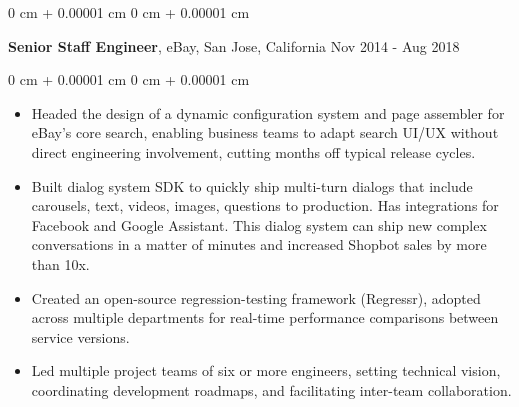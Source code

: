\documentclass[10pt, letterpaper]{article}
\newenvironment{highlights}{
    \begin{itemize}[
        topsep=0.10 cm,
        parsep=0.10 cm,
        partopsep=0pt,
        itemsep=0pt,
        leftmargin=0 cm + 10pt
    ]
}{
    \end{itemize}
} %
\newenvironment{onecolentry}{
    \begin{adjustwidth}{
        0 cm + 0.00001 cm
    }{
        0 cm + 0.00001 cm
    }
}{
    \end{adjustwidth}
} %
\newenvironment{twocolentry}[2][]{
    \onecolentry
    \def\secondColumn{#2}
    \setcolumnwidth{\fill, 4.5 cm}
    \begin{paracol}{2}
}{
    \switchcolumn \raggedleft \secondColumn
    \end{paracol}
    \endonecolentry
} %
\begin{document}
        \vspace{0.15 cm}
        \begin{twocolentry}{
            Nov 2014 - Aug 2018
        }
            \textbf{Senior Staff Engineer}, eBay, San Jose, California\end{twocolentry}
        \vspace{0.10 cm}
        \begin{onecolentry}
            \begin{highlights}
                \item Headed the design of a dynamic configuration system and page assembler for eBay's core search, enabling business teams to adapt search UI/UX without direct engineering involvement, cutting months off typical release cycles.
                \item Built dialog system SDK to quickly ship multi-turn dialogs that include carousels, text, videos, images, questions to production. Has integrations for Facebook and Google Assistant. This dialog system can ship new complex conversations in a matter of minutes and increased Shopbot sales by more than 10x.
                \item Created an open-source regression-testing framework (Regressr), adopted across multiple departments for real-time performance comparisons between service versions.
                \item Led multiple project teams of six or more engineers, setting technical vision, coordinating development roadmaps, and facilitating inter-team collaboration.
            \end{highlights}
        \end{onecolentry}
\end{document}
